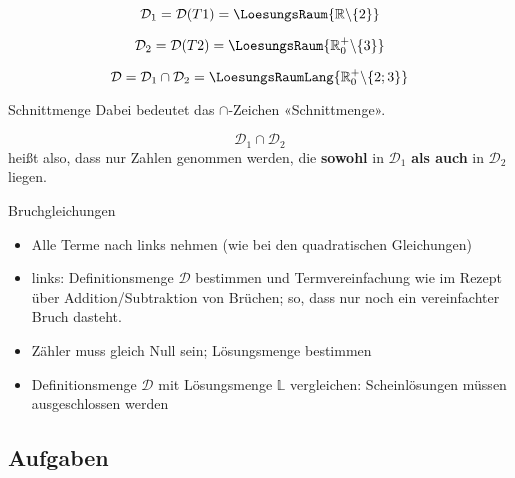   $$\mathcal{D}_1=\mathcal{D}(T1)=\LoesungsRaum{\mathbb{R}\backslash\{2\}}$$

  $$\mathcal{D}_2=\mathcal{D}(T2)=\LoesungsRaum{\mathbb{R}^+_0\backslash\{3\}}$$

  $$\mathcal{D}=\mathcal{D}_1\cap\mathcal{D}_2=\LoesungsRaumLang{\mathbb{R}^{+}_{0}\backslash\{2;3\}}$$

  \begin{bemerkung}{Schnittmenge}{}
    Dabei bedeutet das $\cap$-Zeichen «Schnittmenge».

    $$\mathcal{D}_1\cap\mathcal{D}_2$$
    heißt also, dass nur Zahlen genommen werden, die \textbf{sowohl}
    in $\mathcal{D}_1$ \textbf{als auch} in $\mathcal{D}_2$ liegen.
    \end{bemerkung}

  \newpage
  
\begin{rezept}{Bruchgleichungen}{}
  \begin{itemize}
  \item Alle Terme nach links nehmen (wie bei den quadratischen Gleichungen)
  \item links: Definitionsmenge $\mathcal{D}$ bestimmen und
    Termvereinfachung wie im Rezept über Addition/Subtraktion von
    Brüchen\fi{}; so, dass nur noch ein vereinfachter Bruch dasteht.
  \item Zähler muss gleich Null sein; Lösungsmenge bestimmen
   \item Definitionsmenge $\mathcal{D}$ mit Lösungsmenge $\mathbb{L}$
     vergleichen: Scheinlösungen müssen ausgeschlossen werden
  \end{itemize}
  
\end{rezept}

\subsection*{Aufgaben}





\newpage
